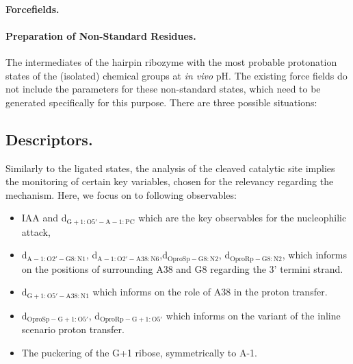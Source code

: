 \documentclass[journal=jacsat,manuscript=article]{achemso}
\begin{document}
\paragraph{Forcefields.}

\paragraph{Preparation of Non-Standard Residues.}

The intermediates of the hairpin ribozyme with the most probable protonation states of the (isolated)
chemical groups at \textit{in vivo} pH.
The existing force fields do not include the parameters for these non-standard states, 
which need to be generated specifically for this purpose.
There are three possible situations:



\subsection{Descriptors.}


Similarly to the ligated states, 
the analysis of the cleaved catalytic site implies the monitoring of certain key variables, 
chosen for the relevancy regarding the mechanism.
Here, we focus on to following observables: 
\begin{itemize}
    \item IAA and d$_\mathrm{G+1:O5' - A-1:PC}$ which are the key observables for the nucleophilic attack,
    \item d$_\mathrm{A-1:O2' - G8:N1}$, d$_\mathrm{A-1:O2' - A38:N6}$,d$_\mathrm{OproSp - G8:N2}$, d$_\mathrm{OproRp - G8:N2}$, which informs on the positions of surrounding A38 and G8 regarding the 3' termini strand.
    \item d$_\mathrm{G+1:O5' - A38:N1}$ which informs on the role of A38 in the proton transfer.
    \item d$_\mathrm{OproSp - G+1:O5'}$, d$_\mathrm{OproRp - G+1:O5'}$ which informs on the variant of the inline scenario proton transfer.
    \item The puckering of the G+1 ribose, symmetrically to A-1.
\end{itemize}
\end{document}
